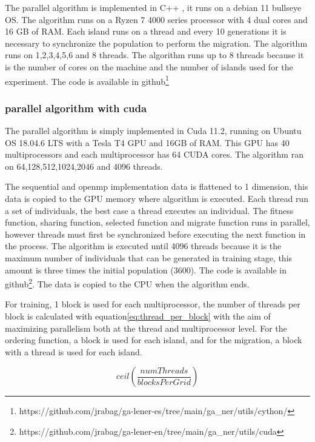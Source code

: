 \documentclass{IEEEtran}
\begin{document}
The parallel algorithm is implemented in C++ , it runs on a debian 11 bullseye OS. The algorithm runs on a Ryzen 7 4000 series processor with 4 dual cores and 16 GB of RAM. Each island runs on a thread and every 10 generations it is necessary to synchronize the population to perform the migration. The algorithm runs on 1,2,3,4,5,6 and 8 threads. The algorithm runs up to 8 threads because it is the number of cores on the machine and the number of islands used for the experiment. The code is available in github\footnote{https://github.com/jrabag/ga\--lener\--es/tree/main/ga\_ner/utils/cython/}


\subsubsection{parallel algorithm with cuda}

The parallel algorithm is simply implemented in Cuda 11.2, running on Ubuntu OS 18.04.6 LTS with a Tesla T4 GPU and 16GB of RAM. This GPU has 40 multiprocessors and each multiprocessor has 64 CUDA cores. The algorithm ran on 64,128,512,1024,2046 and 4096 threads.

The sequential and openmp implementation data is flattened to 1 dimension, this data is copied to the GPU memory where algorithm is executed. Each thread run a set of individuals, the best case a thread executes an individual. The fitness function, sharing function, selected function and migrate function runs in parallel, however threads must first be synchronized before executing the next function in the process. The algorithm is executed until 4096 threads because it is the maximum number of individuals that can be generated in training stage, this amount is three times the initial population (3600). The code is available in github\footnote{https://github.com/jrabag/ga\--lener\--en/tree/main/ga\_ner/utils/cuda}. The data is copied to the CPU when the algorithm ends.

For training, 1 block is used for each multiprocessor, the number of threads per block is calculated with equation\ref{eq:thread_per_block} with the aim of maximizing parallelism both at the thread and multiprocessor level. For the ordering function, a block is used for each island, and for the migration, a block with a thread is used for each island.

\begin{equation}
  \label{eq:thread_per_block}
  ceil(\frac{numThreads}{blocksPerGrid})
\end{equation}
\end{document}
